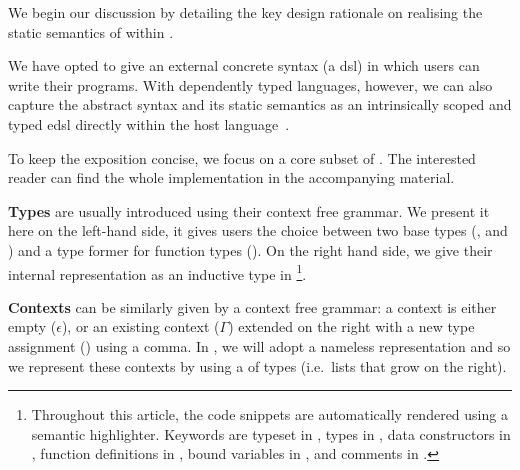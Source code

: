 We begin our discussion by detailing the key design rationale on
realising the static semantics of \Velo{} within \Idris{}.

We have opted to give \Velo{} an external concrete syntax (a \ac{dsl})
in which users can write their programs.
%
With dependently typed languages, however, we can also capture
the abstract syntax and its static semantics as an intrinsically
scoped and typed \ac{edsl}
directly within the host language~\cite{Augustsson1999edt}.

To keep the exposition concise, we focus on a core subset of \Velo{}.
%
The interested reader can find the whole implementation in the accompanying material.

\textbf{Types} are usually introduced using their context free grammar.
%
We present it here on the left-hand side, it gives users the choice between
two base types (\TyNat, and \TyBool) and a type former for function types
(\TyFunc{\cdot}{\cdot}).
%
On the right hand side, we give their internal representation as an inductive
type in \Idris{}
\footnote{
Throughout this article, the \Idris{} code snippets are
automatically rendered using a semantic highlighter.
%
Keywords are typeset in ,
types in ,
data constructors in ,
function definitions in ,
bound variables in ,
and comments in .
}.

\begin{center}
\begin{minipage}{0.45\textwidth}
\syntaxtypes
\end{minipage}\hfill
\begin{minipage}{0.45\textwidth}
\end{minipage}
\end{center}

\textbf{Contexts} can be similarly given by a context free grammar:
a context is either empty ($\epsilon$), or an existing context ($\Gamma$)
extended on the right with a new type assignment () using a comma.
%
In \Idris{}, we will adopt a nameless representation and so we represent
these contexts by using a  of types
(i.e.\ lists that grow on the right).


\begin{center}
\begin{minipage}{0.35\textwidth}
\syntaxcontexts
\end{minipage}\hfill
\begin{minipage}{0.55\textwidth}
\end{minipage}
\end{center}


